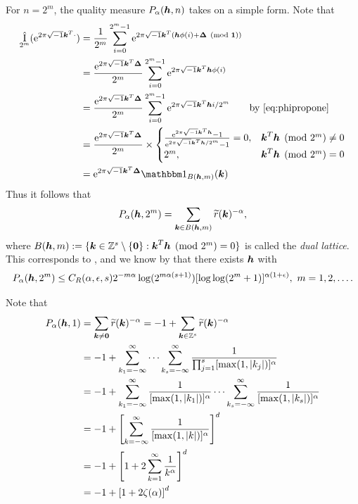 \documentclass{amsart}
\newcommand{\tr}{\widetilde{r}}
\DeclareMathOperator{\appxint}{\hat{I}}
\begin{document}
For $n = 2^m$, the quality measure $P_\alpha(\boldsymbol{h},n)$ takes on a simple form.  Note that 
\begin{align}\label{Eq:DualLattice}
    \appxint_{2^m}(\me^{2 \pi \sqrt{-1} \vk^T \cdot}) 
    &= \frac 1{2^m} \sum_{i=0}^{2^m-1} \me^{2 \pi \sqrt{-1} \vk^T (\vh\phi(i) + \vDelta \pmod{\vone})} \\
    \nonumber
    &= \frac {\me^{2 \pi \sqrt{-1} \vk^T \vDelta}}{2^m} \sum_{i=0}^{2^m-1} \me^{2 \pi \sqrt{-1} \vk^T \vh\phi(i)} \\
    \nonumber
    &= \frac {\me^{2 \pi \sqrt{-1} \vk^T \vDelta}}{2^m} \sum_{i=0}^{2^m-1} \me^{2 \pi \sqrt{-1} \vk^T \vh i/2^m} \qquad \text{by \eqref{eq:phipropone}}\\
    \nonumber
    &= \frac {\me^{2 \pi \sqrt{-1} \vk^T \vDelta}}{2^m} \times
    \begin{cases} 
    \frac{\me^{2 \pi \sqrt{-1} \vk^T \vh} - 1}{\me^{2 \pi \sqrt{-1} \vk^T \vh/2^m} - 1} = 0, & \vk^T \vh \pmod{2^m} \ne 0\\
    2^m, & \vk^T \vh \pmod{2^m} = 0
    \end{cases} \\
    \nonumber
    & = \me^{2 \pi \sqrt{-1} \vk^T \vDelta} \bbone_{B(\vh,m)}(\vk)
\end{align}
Thus it follows that
\begin{equation*}
    P_\alpha(\vh,2^m) = \sum_{\vk \in B(\vh,m)} \tr(\vk)^{-\alpha},
\end{equation*}
where $B(\boldsymbol{h},m) : = \{\boldsymbol{k} \in \mathbb{Z}^s \setminus \{\boldsymbol{0}\} : \boldsymbol{k}^T \boldsymbol{h} \pmod{2^m} = 0\}$ is called the \emph{dual lattice}.  This corresponds to \cite[Equation (3)]{HicNie03a}, and we know by \cite[Theorem 5]{HicNie03a} that  there exists $\boldsymbol{h}$ with
\begin{equation} \label{eq:Niedbd}
    P_{\alpha}(\boldsymbol{h},2^m) \le C_{R}(\alpha,\epsilon,s)
    2^{-m\alpha} \log(2^{m\alpha(s+1)}) [\log \log (
    2^m+1)]^{\alpha(1+\epsilon)}, \ m = 1, 2,\ldots.
\end{equation}


Note that
\begin{align*}
    P_{\alpha}(\vh,1) & = \sum_{\vk \ne \vzero} \tr(\vk)^{-\alpha} = -1 + \sum_{\vk \in \integers^s} \tr(\vk)^{-\alpha} \\
    & = -1 + \sum_{k_1 =-\infty}^{\infty} \cdots \sum_{k_s  =-\infty}^{\infty} \frac{1}{\prod_{j=1}^s[\max(1,\abs{k_j})]^\alpha} \\
    & = -1 + \sum_{k_1 =-\infty}^{\infty} \frac{1}{[\max(1,\abs{k_1})]^\alpha} \cdots \sum_{k_s  =-\infty}^{\infty} \frac{1}{[\max(1,\abs{k_s})]^\alpha} \\
    & = -1 + \left[\sum_{k =-\infty}^{\infty} \frac{1}{[\max(1,\abs{k})]^\alpha} \right]^d \\
    & = -1 + \left[1 + 2 \sum_{k =1}^{\infty} \frac{1}{k^\alpha} \right]^d \\
    & = -1 + \left[1 + 2 \zeta(\alpha) \right]^d
\end{align*}
\end{document}
